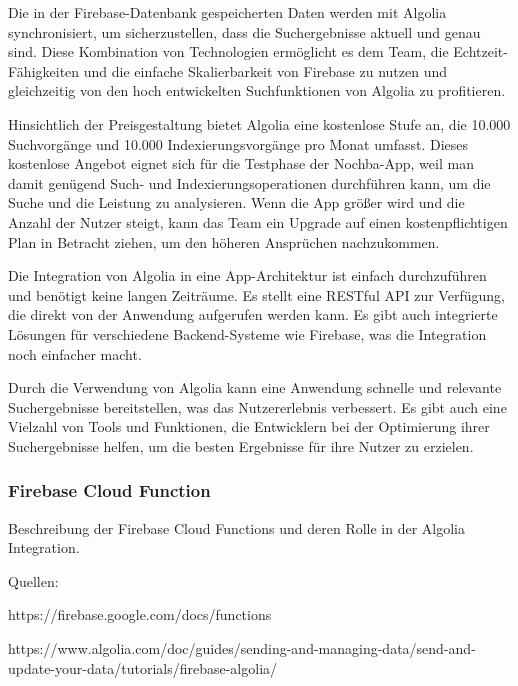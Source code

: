 Die in der Firebase-Datenbank gespeicherten Daten werden mit Algolia synchronisiert, um sicherzustellen, dass die Suchergebnisse aktuell und genau sind. Diese Kombination von Technologien ermöglicht es dem Team, die Echtzeit-Fähigkeiten und die einfache Skalierbarkeit von Firebase zu nutzen und gleichzeitig von den hoch entwickelten Suchfunktionen von Algolia zu profitieren.

Hinsichtlich der Preisgestaltung bietet Algolia eine kostenlose Stufe an, die 10.000 Suchvorgänge und 10.000 Indexierungsvorgänge pro Monat umfasst. Dieses kostenlose Angebot eignet sich für die Testphase der Nochba-App, weil man damit genügend Such- und Indexierungsoperationen durchführen kann, um die Suche und die Leistung zu analysieren. Wenn die App größer wird und die Anzahl der Nutzer steigt, kann das Team ein Upgrade auf einen kostenpflichtigen Plan in Betracht ziehen, um den höheren Ansprüchen nachzukommen.

Die Integration von Algolia in eine App-Architektur ist einfach durchzuführen und benötigt keine langen Zeiträume. Es stellt eine RESTful API zur Verfügung, die direkt von der Anwendung aufgerufen werden kann. Es gibt auch integrierte Lösungen für verschiedene Backend-Systeme wie Firebase, was die Integration noch einfacher macht.

Durch die Verwendung von Algolia kann eine Anwendung schnelle und relevante Suchergebnisse bereitstellen, was das Nutzererlebnis verbessert. Es gibt auch eine Vielzahl von Tools und Funktionen, die Entwicklern bei der Optimierung ihrer Suchergebnisse helfen, um die besten Ergebnisse für ihre Nutzer zu erzielen.

\subsubsection{Firebase Cloud Function}

Beschreibung der Firebase Cloud Functions und deren Rolle in der Algolia Integration.

Quellen:

https://firebase.google.com/docs/functions

https://www.algolia.com/doc/guides/sending-and-managing-data/send-and-update-your-data/tutorials/firebase-algolia/
